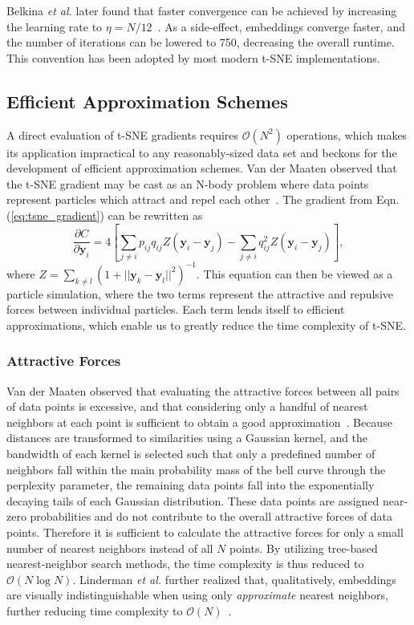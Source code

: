 \documentclass[twocolumn]{bmcart}
\begin{document}
Belkina \textit{et al.} later found that faster convergence can be achieved by
increasing the learning rate to $\eta=N/12$~\cite{belkina2019automated}. As a side-effect, embeddings converge faster, and the
number of iterations can be lowered to 750, decreasing the overall runtime.
This convention has been adopted by most modern t-SNE implementations.

\subsection*{Efficient Approximation Schemes} A direct evaluation of t-SNE
gradients requires $\mathcal{O}(N^2)$ operations, which makes its application
impractical to any reasonably-sized data set and beckons for the development of
efficient approximation schemes. Van der Maaten observed that the t-SNE
gradient may be cast as an N-body problem where data points represent
particles which attract and repel each
other~\cite{van2014accelerating}. The gradient from Eqn. (\ref{eq:tsne_gradient}) can be rewritten as
\begin{equation}
\frac{\partial C}{\partial \mathbf{y}_i} = 4 \left [ \sum_{j \neq i} p_{ij} q_{ij} Z \left ( \mathbf{y}_i - \mathbf{y}_j \right ) -\sum_{j \neq i} q_{ij}^2 Z \left ( \mathbf{y}_i - \mathbf{y}_j \right ) \right ], \label{eq:grad_attr_rep}
\end{equation}
where $Z = \sum_{k \neq l}\left ( 1 + || \mathbf{y}_k - \mathbf{y}_l ||^2
\right )^{-1}$. This equation can then be viewed as a particle simulation, where 
the two terms represent the attractive and repulsive
forces between individual particles. Each term lends itself to efficient
approximations, which enable us to greatly reduce the time complexity of t-SNE.

\subsubsection*{Attractive Forces}

Van der Maaten observed that evaluating the attractive forces between all pairs
of data points is excessive, and that considering only a handful of nearest
neighbors at each point is sufficient to obtain a good approximation~\cite{van2014accelerating}.
Because distances are transformed to similarities using a Gaussian kernel, and
the bandwidth of each kernel is selected such that only a predefined number of
neighbors fall within the main probability mass of the bell curve through the perplexity parameter, the remaining
data points fall into the exponentially decaying tails of each Gaussian distribution.
These data points are assigned near-zero probabilities and do not contribute
to the overall attractive forces of data points.
Therefore it is sufficient to calculate the attractive forces for only a
small number of nearest neighbors instead of all $N$ points. By
utilizing tree-based nearest-neighbor search methods, the time complexity is
thus reduced to $\mathcal{O}(N \log N)$. Linderman \textit{et al.} further
realized that, qualitatively, embeddings are visually
indistinguishable when using only \textit{approximate} nearest neighbors,
further reducing time complexity to $\mathcal{O}(N)$~\cite{linderman2019fast}.
\end{document}
